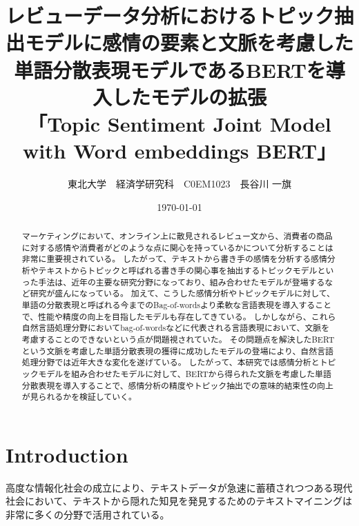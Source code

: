 \documentclass[uplatex]{jsarticle}
\title{レビューデータ分析におけるトピック抽出モデルに感情の要素と文脈を考慮した単語分散表現モデルであるBERTを導入したモデルの拡張\\「Topic Sentiment Joint Model with Word embeddings BERT」}
\author{東北大学　経済学研究科　C0EM1023　長谷川 一旗}
\date{\today}
\begin{document}
\maketitle

\begin{abstract}
    \large
    マーケティングにおいて、オンライン上に散見されるレビュー文から、消費者の商品に対する感情や消費者がどのような点に関心を持っているかについて分析することは非常に重要視されている。
    したがって、テキストから書き手の感情を分析する感情分析やテキストからトピックと呼ばれる書き手の関心事を抽出するトピックモデルといった手法は、近年の主要な研究分野になっており、組み合わせたモデルが登場するなど研究が盛んになっている。
    加えて、こうした感情分析やトピックモデルに対して、単語の分散表現と呼ばれる今までのBag-of-wordsより柔軟な言語表現を導入することで、性能や精度の向上を目指したモデルも存在してきている。
    しかしながら、これら自然言語処理分野においてbag-of-wordsなどに代表される言語表現において、文脈を考慮することのできないという点が問題視されていた。
    その問題点を解決したBERTという文脈を考慮した単語分散表現の獲得に成功したモデルの登場により、自然言語処理分野では近年大きな変化を遂げている。
    したがって、本研究では感情分析とトピックモデルを組み合わせたモデルに対して、BERTから得られた文脈を考慮した単語分散表現を導入することで、感情分析の精度やトピック抽出での意味的結束性の向上が見られるかを検証していく。
\end{abstract}
\newpage
\tableofcontents
\twocolumn
\section{Introduction}
高度な情報化社会の成立により、テキストデータが急速に蓄積されつつある現代社会において、テキストから隠れた知見を発見するためのテキストマイニングは非常に多くの分野で活用されている。
\end{document}
